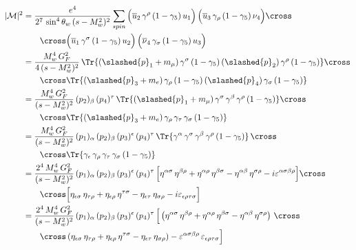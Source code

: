 \begin{align}
    |\mathcal{M}|^2 &= \frac{e^4}{2^7\, \sin^4\theta_w\, (s-M_w^2)^2}\sum_{spin}\Big( \overline{u}_2\, \gamma^\rho\, (1-\gamma_5)\, u_1 \Big)\, \Big( \overline{u}_3\, \gamma_\rho\, (1-\gamma_5)\, \nu_4 \Big)\cross \notag \\
    &\qquad \cross \Big( \overline{u}_1\, \gamma^\sigma\, (1-\gamma_5)\, u_2 \Big)\, \Big( \overline{\nu}_4\, \gamma_\sigma\, (1-\gamma_5)\, u_3 \Big) \\
    &= \frac{M_w^4\, G_F^2}{4\, (s-M_w^2)^2}\, \Tr{(\slashed{p}_1 + m_\mu)\, \gamma^\sigma\, (1-\gamma_5)\, (\slashed{p}_2)\, \gamma^\rho\, (1-\gamma_5)}\cross \notag \\
    &\qquad \cross \Tr{(\slashed{p}_3 + m_e)\, \gamma_\rho\, (1-\gamma_5)\, (\slashed{p}_4)\, \gamma_\sigma\, (1-\gamma_5)} \\
    &= \frac{M_w^4\, G_F^2}{(s-M_w^2)^2}\, (p_2)_\beta\, (p_4)^\tau\, \Tr{(\slashed{p}_1 + m_\mu)\, \gamma^\sigma\, \gamma^\beta\, \gamma^\rho\, (1-\gamma_5)}\cross \notag \\
    &\qquad \cross \Tr{(\slashed{p}_3 + m_e)\, \gamma_\rho\, \gamma_\tau\, \gamma_\sigma\, (1-\gamma_5)} \\
    &= \frac{M_w^4\, G_F^2}{(s-M_w^2)^2}\, (p_1)_\alpha\, (p_2)_\beta\, (p_3)^\epsilon\, (p_4)^\tau\, \Tr{\gamma^\alpha\, \gamma^\sigma\, \gamma^\beta\, \gamma^\rho\, (1-\gamma_5)}\, \cross \notag \\
    &\qquad \cross \Tr{\gamma_\epsilon\, \gamma_\rho\, \gamma_\tau\, \gamma_\sigma\, (1-\gamma_5)} \\
    &= \frac{2^4\, M_w^4\, G_F^2}{(s-M_w^2)^2}\, (p_1)_\alpha\, (p_2)_\beta\, (p_3)^\epsilon\, (p_4)^\tau\, \Big[ \eta^{\alpha\sigma}\, \eta^{\beta\rho} + \eta^{\alpha\rho}\, \eta^{\beta\sigma} - \eta^{\alpha\beta}\, \eta^{\sigma\rho} - i\varepsilon^{\alpha\sigma\beta\rho} \Big] \cross \notag \\
    &\qquad \cross \Big[ \eta_{\epsilon\sigma}\, \eta_{\tau\rho} + \eta_{\epsilon\rho}\, \eta^{\tau\sigma} - \eta_{\epsilon\tau}\, \eta_{\sigma\rho} - i\varepsilon_{\epsilon\rho\tau\sigma} \Big] \\
    &= \frac{2^4\, M_w^4\, G_F^2}{(s-M_w^2)^2}\, (p_1)_\alpha\, (p_2)_\beta\, (p_3)^\epsilon\, (p_4)^\tau\, \Big[ \left( \eta^{\alpha\sigma}\, \eta^{\beta\rho} + \eta^{\alpha\rho}\, \eta^{\beta\sigma} - \eta^{\alpha\beta}\, \eta^{\sigma\rho} \right)\, \cross \notag \\
    &\qquad \cross \left( \eta_{\epsilon\sigma}\, \eta_{\tau\rho} + \eta_{\epsilon\rho}\, \eta^{\tau\sigma} - \eta_{\epsilon\tau}\, \eta_{\sigma\rho} \right) - \varepsilon^{\alpha\sigma\beta\rho}\, \varepsilon_{\epsilon\rho\tau\sigma} \Big] \\

\end{align}
